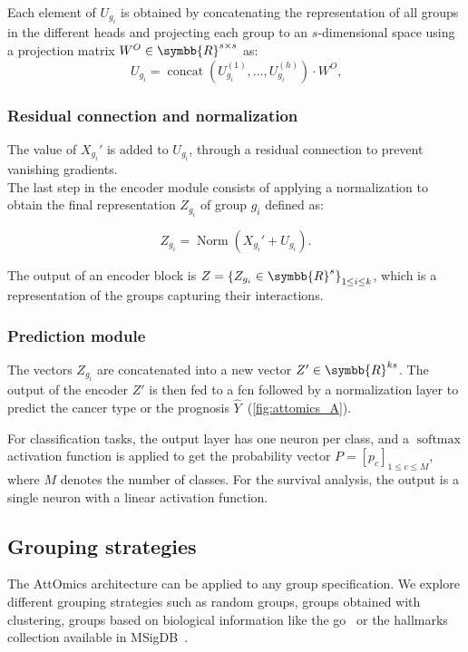 \documentclass[../main.tex]{subfiles}
\begin{document}
			Each element of \(U_{g_i}\) is obtained by concatenating the representation of all groups in the different heads and projecting each group to an \(s\)-dimensional space using a projection matrix \(W^O \in \symbb{R}^{s\times s}\) as:
			\[ U_{g_i} = \operatorname{concat}\left( U^{(1)}_{g_i}, \ldots, U^{(h)}_{g_i} \right) \cdot W^O \text{,}\]
		\subsubsection{Residual connection and normalization}
			The value of \(X_{g_i}'\) is added to \(U_{g_i}\), through a residual connection to prevent vanishing gradients.\\
			The last step in the encoder module consists of applying a normalization to obtain the final representation \(Z_{g_i}\) of group \(g_i\) defined as:

			\[Z_{g_i} = \operatorname{Norm}\left(X_{g_i}' + U_{g_i} \right) \text{.}\]

			The output of an encoder block is \(Z = {\left\{ Z_{g_i} \in \symbb{R}^{s}\right\}}_{1 \leq i \leq k}\), which is a representation of the groups capturing their interactions.

		\subsubsection{Prediction module}
			The vectors \(Z_{g_i}\) are concatenated into a new vector \(Z' \in \symbb{R}^{ks}\).
			The output of the encoder \(Z'\) is then fed to a \gls{fcn} followed by a normalization layer to predict the cancer type or the prognosis \(\hat{Y}\)~(\cref{fig:attomics_A}).

			For classification tasks,  the output layer has one neuron per class, and a \(\operatorname{softmax}\) activation function is applied to get the probability vector \(P = {\left[p_c\right]}_{1\leq c\leq M}\), where \(M\) denotes the number of classes.
			For the survival analysis, the output is a single neuron with a linear activation function.

	\subsection{Grouping strategies}\label{sec:grouping}

		The AttOmics architecture can be applied to any group specification.
		We explore different grouping strategies such as random groups, groups obtained with clustering, groups based on biological information like the \gls{go}~\cite{geneontologyconsortiumGeneOntologyResource2021} or the hallmarks collection available in MSigDB~\cite{Liberzon2015}.
\end{document}

